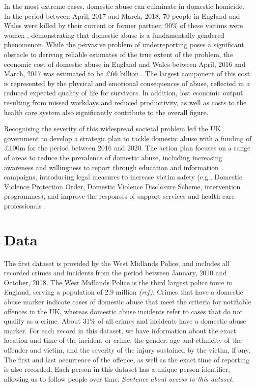 \documentclass[11pt, a4paper]{article}
\begin{document}
In the most extreme cases, domestic abuse can culminate in domestic homicide. In the period between April, 2017 and March, 2018, 70 people in England and Wales were killed by their current or former partner, 90\% of these victims were women \cite{homic}, demonstrating that domestic abuse is a fundamentally gendered phenomenon. While the pervasive problem of underreporting poses a significant obstacle to deriving reliable estimates of the true extent of the problem, the economic cost of domestic abuse in England and Wales between April, 2016 and March, 2017 was estimated to be \pounds 66 billion \cite{costs}. The largest component of this cost is represented by the physical and emotional consequences of abuse, reflected in a reduced expected quality of life for survivors. In addition, lost economic output resulting from missed workdays and reduced productivity, as well as costs to the health care system also significantly contribute to the overall figure. 


Recognising the severity of this widespread societal problem led the UK government to develop a strategic plan to tackle domestic abuse with a funding of £100m for the period between 2016 and 2020. The action plan focuses on a range of areas to reduce the prevalence of domestic abuse, including increasing awareness and willingness to report through education and information campaigns, introducing legal measures to increase victim safety (e.g., Domestic Violence Protection Order, Domestic Violence Disclosure Scheme, intervention programmes), and improve the responses of support services and health care professionals \cite{vawag}. 


\newpage


\section{Data}


The first dataset is provided by the West Midlands Police, and includes all recorded crimes and incidents from the period between January, 2010 and October, 2018. The West Midlands Police is the third largest police force in England, serving a population of 2.9 million \textit{(ref)}. Crimes that have a domestic abuse marker indicate cases of domestic abuse that meet the criteria for notifiable offences in the UK, whereas domestic abuse incidents refer to cases that do not qualify as a crime. About 31\% of all crimes and incidents have a domestic abuse marker. For each record in this dataset, we have information about the exact location and time of the incident or crime, the gender, age and ethnicity of the offender and victim, and the severity of the injury sustained by the victim, if any. The first and last occurrence of the offence, as well as the exact time of reporting is also recorded. Each person in this dataset has a unique person identifier, allowing us to follow people over time. \textit{Sentence about access to this dataset.}
\end{document}
